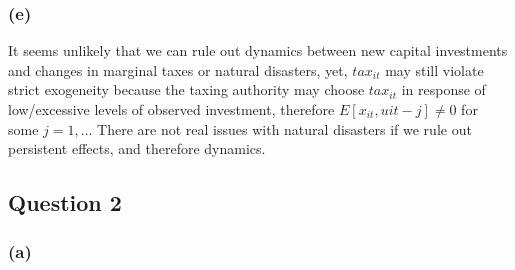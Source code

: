 \documentclass[
]{article}
\begin{document}
\hypertarget{e}{%
\subsubsection{(e)}\label{e}}

It seems unlikely that we can rule out dynamics between new capital
investments and changes in marginal taxes or natural disasters, yet,
\(tax_{it}\) may still violate strict exogeneity because the taxing
authority may choose \(tax_{it}\) in response of low/excessive levels of
observed investment, therefore \(E[x_{it},u{it-j}]\ne0\) for some
\(j=1,..\). There are not real issues with natural disasters if we rule
out persistent effects, and therefore dynamics.

\newpage

\hypertarget{question-2}{%
\subsection{Question 2}\label{question-2}}

\hypertarget{a-1}{%
\subsubsection{(a)}\label{a-1}}
\end{document}
